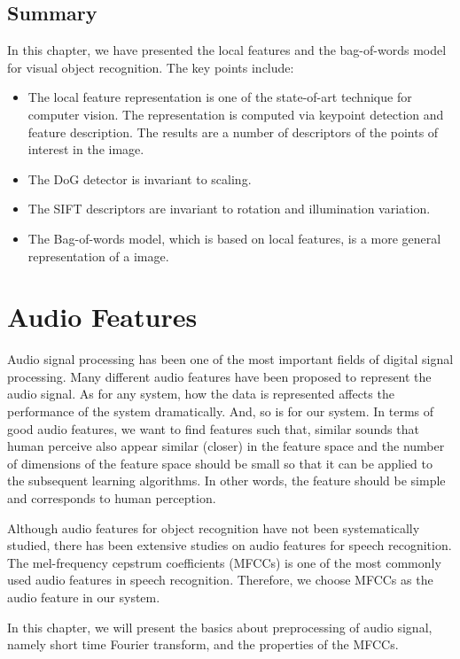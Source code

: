 \documentclass[12pt,final,twoside]{report}
\theoremstyle{plain}
\theoremstyle{definition}
\theoremstyle{remark}
\begin{document}
\section{Summary}
In this chapter, we have presented the local features and the bag-of-words model for visual object recognition. The key points include:
\begin{itemize}
  \item The local feature representation is one of the state-of-art technique for computer vision. The representation is computed via keypoint detection and feature description. The results are a number of descriptors of the points of interest in the image. 
  \item The DoG detector is invariant to scaling.
  \item The SIFT descriptors are invariant to rotation and illumination variation.
  \item The Bag-of-words model, which is based on local features, is a more general representation of a image. 
\end{itemize}

\cleardoublepage
\chapter{Audio Features}
Audio signal processing has been one of the most important fields of digital signal processing. Many different audio features have been proposed to represent the audio signal. As for any system, how the data is represented affects the performance of the system dramatically. And, so is for our system. In terms of good audio features, we want to find features such that, similar sounds that human perceive also appear similar (closer) in the feature space and the number of dimensions of the feature space should be small so that it can be applied to the subsequent learning algorithms. In other words, the feature should be simple and corresponds to human perception.

Although audio features for object recognition have not been systematically studied, there has been extensive studies on audio features for speech recognition. The mel-frequency cepstrum coefficients (MFCCs) is one of the most commonly used audio features in speech recognition. Therefore, we choose MFCCs as the audio feature in our system.

In this chapter, we will present the basics about preprocessing of audio signal, namely short time Fourier transform, and the properties of the MFCCs.
\end{document}

